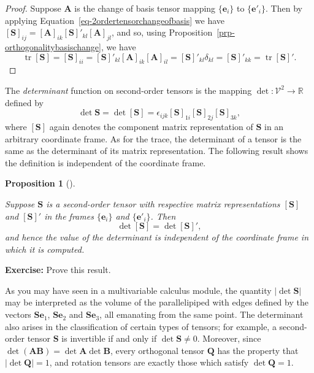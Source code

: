 \documentclass[
  letterpaper,
  DIV=11,
  numbers=noendperiod]{scrreprt}
\theoremstyle{plain}
\newtheorem{proposition}{Proposition}[chapter]
\theoremstyle{remark}
\begin{document}
\begin{proof}
Suppose \({\boldsymbol{A}}\) is the change of basis tensor mapping
\(\{{\boldsymbol{e}}_i\}\) to \(\{{\boldsymbol{e}}'_i\}\). Then by
applying Equation~\ref{eq-2ordertensorchangeofbasis} we have
\([{\boldsymbol{S}}]_{ij} = [{\boldsymbol{A}}]_{ik}[{\boldsymbol{S}}]'_{kl}[{\boldsymbol{A}}]_{jl}\),
and so, using Proposition~\ref{prp-orthogonalitybasischange}, we have
\[{\operatorname{tr}}[{\boldsymbol{S}}]
    = [{\boldsymbol{S}}]_{ii}
    = [{\boldsymbol{S}}]'_{kl}[{\boldsymbol{A}}]_{ik}[{\boldsymbol{A}}]_{il}
    = [{\boldsymbol{S}}]'_{kl}\delta_{kl}
    = [{\boldsymbol{S}}]'_{kk} = {\operatorname{tr}}[{\boldsymbol{S}}]'.\]
\end{proof}

The \emph{determinant} function on second-order tensors is the mapping
\(\det:{\mathcal{V}}^2\to{\mathbb{R}}\) defined by
\[\det{\boldsymbol{S}}= \det[{\boldsymbol{S}}] = \epsilon_{ijk}[{\boldsymbol{S}}]_{1i}[{\boldsymbol{S}}]_{2j}[{\boldsymbol{S}}]_{3k},\]
where \([{\boldsymbol{S}}]\) again denotes the component matrix
representation of \({\boldsymbol{S}}\) in an arbitrary coordinate frame.
As for the trace, the determinant of a tensor is the same as the
determinant of its matrix representation. The following result shows the
definition is independent of the coordinate frame.

\begin{proposition}[]\protect\hypertarget{prp-determinantinvariance}{}\label{prp-determinantinvariance}

Suppose \({\boldsymbol{S}}\) is a second-order tensor with respective
matrix representations \([{\boldsymbol{S}}]\) and
\([{\boldsymbol{S}}]'\) in the frames \(\{{\boldsymbol{e}}_i\}\) and
\(\{{\boldsymbol{e}}'_i\}\). Then
\[\det[{\boldsymbol{S}}] = \det[{\boldsymbol{S}}]',\] and hence the
value of the determinant is independent of the coordinate frame in which
it is computed.

\end{proposition}

\textbf{Exercise:} Prove this result.

As you may have seen in a multivariable calculus module, the quantity
\(|\det{\boldsymbol{S}}|\) may be interpreted as the volume of the
parallelipiped with edges defined by the vectors
\({\boldsymbol{S}}{\boldsymbol{e}}_1\),
\({\boldsymbol{S}}{\boldsymbol{e}}_2\) and
\({\boldsymbol{S}}{\boldsymbol{e}}_3\), all emanating from the same
point. The determinant also arises in the classification of certain
types of tensors; for example, a second-order tensor
\({\boldsymbol{S}}\) is invertible if and only if
\(\det{\boldsymbol{S}}\neq0\). Moreover, since
\(\det({\boldsymbol{A}}{\boldsymbol{B}}) = \det{\boldsymbol{A}}\det{\boldsymbol{B}}\),
every orthogonal tensor \({\boldsymbol{Q}}\) has the property that
\(|\det{\boldsymbol{Q}}|=1\), and rotation tensors are exactly those
which satisfy \(\det{\boldsymbol{Q}}=1\).
\end{document}
